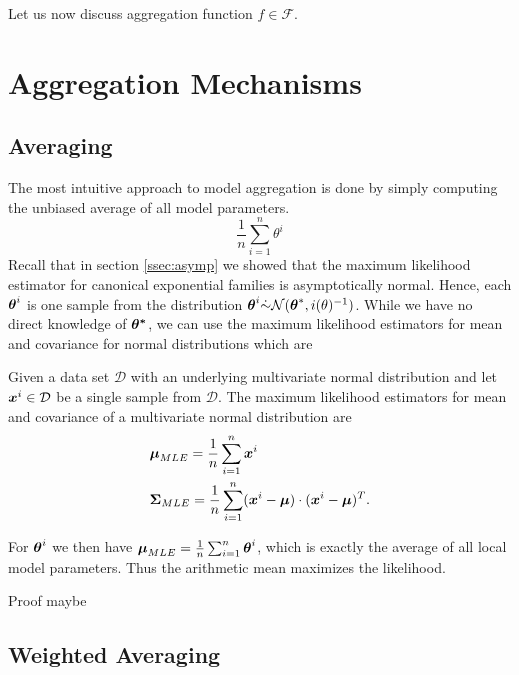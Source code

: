 Let us now discuss aggregation function $f \in \mathcal{F}$.

\section{Aggregation Mechanisms}
\subsection{Averaging}

The most intuitive approach to model aggregation is done by simply computing the unbiased average of all model parameters.
\begin{equation}
    \frac{1}{n} \sum_{i=1}^n \theta^i
\end{equation}
Recall that in section \ref{ssec:asymp} we showed that the maximum likelihood estimator for canonical exponential families is asymptotically normal.
Hence, each $\boldsymbol{\theta}^i$ is one sample from the distribution $\boldsymbol{\theta}^i \dot{\sim} \mathcal{N}(\boldsymbol{\theta}^*, i(\theta)^{-1})$.
While we have no direct knowledge of $\boldsymbol{\theta^*}$, we can use the maximum likelihood estimators for mean and covariance for normal distributions which are

\begin{tcolorbox}
    Given a data set $\mathcal{D}$ with an underlying multivariate normal distribution and let $\boldsymbol{x}^i \in \mathcal{D}$ be a single sample from $\mathcal{D}$.
    The maximum likelihood estimators for mean and covariance of a multivariate normal distribution are
    \begin{equation}
        \begin{split}
            &\boldsymbol{\mu}_{MLE} = \frac{1}{n} \sum_{i=1}^n \boldsymbol{x}^i \\
        &\boldsymbol{\Sigma}_{MLE} = \frac{1}{n} \sum_{i=1}^n (\boldsymbol{x}^i - \boldsymbol{\mu}) \cdot  (\boldsymbol{x}^i - \boldsymbol{\mu})^T.
        \end{split}
    \end{equation}
\end{tcolorbox}
For $\boldsymbol{\theta}^i$ we then have $\boldsymbol{\mu}_{MLE} = \frac{1}{n} \sum_{i=1}^n \boldsymbol{\theta}^i$, which is exactly the average of all local model parameters.
Thus the arithmetic mean maximizes the likelihood.
\begin{tcolorbox}
    Proof maybe 
\end{tcolorbox}


\subsection{Weighted Averaging}

